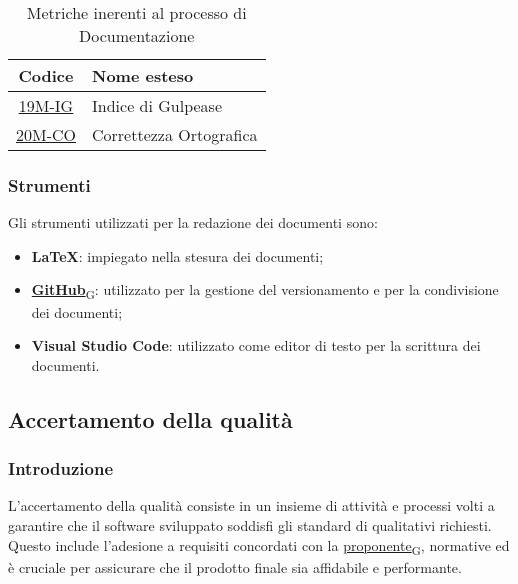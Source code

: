 \begin{table}[!h]
	\centering
	\begin{tabular}{|c|l|}
		\hline
		\textbf{Codice} & \textbf{Nome esteso}               					\\
		\hline
		\underline{\hyperlink{19M}{19M-IG}}     & Indice di Gulpease   			\\
		\underline{\hyperlink{20M}{20M-CO}}     & Correttezza Ortografica  		\\
		\hline
	\end{tabular}
	\caption{Metriche inerenti al processo di Documentazione}
\end{table}

\subsubsection{Strumenti}
Gli strumenti utilizzati per la redazione dei documenti sono:
\begin{itemize}
	\item \textbf{LaTeX}: impiegato nella stesura dei documenti;
	\item \href{https://7last.github.io/docs/rtb/documentazione-interna/glossario\#github}{\textbf{GitHub}\textsubscript{G}}: utilizzato per la gestione del versionamento e per la condivisione dei documenti;
	\item \textbf{Visual Studio Code}: utilizzato come editor di testo per la scrittura dei documenti.
\end{itemize}



\subsection{Accertamento della qualità}
\subsubsection{Introduzione}
L'accertamento della qualità consiste in un insieme di attività e processi volti a garantire che il software sviluppato soddisfi gli standard di qualitativi richiesti. Questo include l'adesione a requisiti concordati con la \href{https://7last.github.io/docs/rtb/documentazione-interna/glossario\#proponente}{proponente\textsubscript{G}}, normative ed è cruciale per assicurare che il prodotto finale sia affidabile e performante.

